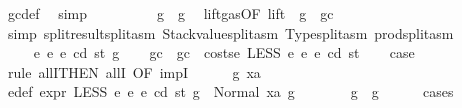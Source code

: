 \begin{isabellebody}
\ gc{\isacharunderscore}{\kern0pt}def\ \isamarkupfalse%
\ simp\isanewline
\ \ \ \ \ \ \isamarkupfalse%
\ \isamarkupfalse%
\ {\isachardoublequoteopen}g{}\ {\isasymle}\ g{\isachardoublequoteclose}\ \isamarkupfalse%
\ lift{\isacharunderscore}{\kern0pt}gas{\isacharbrackleft}{\kern0pt}OF\ lift{\isacharbrackright}{\kern0pt}\ {\isacharbackquoteopen}{\isasymnot}\ g\ {\isasymle}\ gc{\isacharbackquoteclose}\ \isamarkupfalse%
\ {\isacharparenleft}{\kern0pt}simp\ split{\isacharcolon}{\kern0pt}result{\isachardot}{\kern0pt}split{\isacharunderscore}{\kern0pt}asm\ Stackvalue{\isachardot}{\kern0pt}split{\isacharunderscore}{\kern0pt}asm\ Type{\isachardot}{\kern0pt}split{\isacharunderscore}{\kern0pt}asm\ prod{\isachardot}{\kern0pt}split{\isacharunderscore}{\kern0pt}asm{\isacharparenright}{\kern0pt}\isanewline
\ \ \ \ \isamarkupfalse%
\isanewline
\ \ \isamarkupfalse%
\isanewline
{}\isamarkupfalse%
\isanewline
\ \ \isamarkupfalse%
\ {\isacharparenleft}{\kern0pt}{}{}\ e{}\ e{}\ e\ cd\ st\ g{\isacharparenright}{\kern0pt}\isanewline
\ \ \isamarkupfalse%
\ gc\ \ {\isachardoublequoteopen}gc\ {\isacharequal}{\kern0pt}\ costs\isactrlsub e\ {\isacharparenleft}{\kern0pt}LESS\ e{}\ e{}{\isacharparenright}{\kern0pt}\ e\ cd\ st{\isachardoublequoteclose}\isanewline
\ \ \isamarkupfalse%
\ {\isacharquery}{\kern0pt}case\isanewline
\ \ \isamarkupfalse%
\ {\isacharparenleft}{\kern0pt}rule\ allI{\isacharbrackleft}{\kern0pt}THEN\ allI{\isacharcomma}{\kern0pt}\ OF\ impI{\isacharbrackright}{\kern0pt}{\isacharparenright}{\kern0pt}\isanewline
\ \ \ \ \isamarkupfalse%
\ g{}\ xa\ \isamarkupfalse%
\ e{\isacharunderscore}{\kern0pt}def{\isacharcolon}{\kern0pt}\ {\isachardoublequoteopen}expr\ {\isacharparenleft}{\kern0pt}LESS\ e{}\ e{}{\isacharparenright}{\kern0pt}\ e\ cd\ st\ g\ {\isacharequal}{\kern0pt}\ Normal\ {\isacharparenleft}{\kern0pt}xa{\isacharcomma}{\kern0pt}\ g{}{\isacharparenright}{\kern0pt}{\isachardoublequoteclose}\isanewline
\ \ \ \ \isamarkupfalse%
\ \isamarkupfalse%
\ {\isachardoublequoteopen}g{}\ {\isasymle}\ g{\isachardoublequoteclose}\isanewline
\ \ \ \ \isamarkupfalse%
\ {\isacharparenleft}{\kern0pt}cases{\isacharparenright}{\kern0pt}\isanewline

\end{isabellebody}
